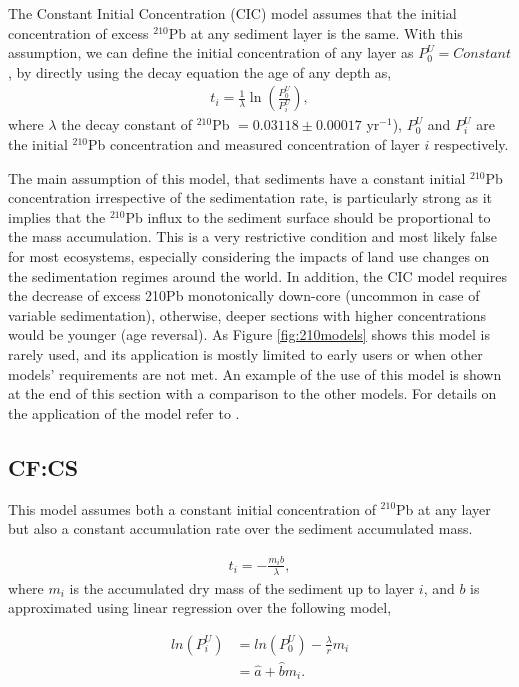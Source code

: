 \documentclass [10pt] {article}
\begin{document}
The Constant Initial Concentration (CIC) model \citep{Goldberg1963,Crozaz1964,Robbins1978} assumes that the initial concentration of excess $^{210}$Pb at any sediment layer is the same. 
With this assumption, we can define the initial concentration of any layer as $P_0^U = Constant$, by directly using the decay equation the age of any depth as,
\begin{eqnarray}
	t_i = \frac{1}{\lambda}\ln \left( \frac{P_0^U}{P_i^U}\right),
\end{eqnarray}
where $\lambda$ the decay constant of $^{210}$Pb $= 0.03118\pm 0.00017$ yr$^{-1}$), $P_0^U$ and $P_i^U$ are the initial $^{210}$Pb concentration and measured concentration of layer $i$ respectively. 

The main assumption of this model, that sediments have a constant initial $^{210}$Pb concentration irrespective of the sedimentation rate, is particularly strong as it implies that the $^{210}$Pb influx to the sediment surface should be proportional to the mass accumulation. 
This is a very restrictive condition and most likely false for most ecosystems, especially considering the impacts of land use changes on the sedimentation regimes around the world. 
In addition, the CIC model requires the decrease of excess 210Pb monotonically down-core (uncommon in case of variable sedimentation), otherwise, deeper sections with higher concentrations would be younger (age reversal).
As Figure \ref{fig:210models} shows this model is rarely used, and its application is mostly limited to early users or when other models’ requirements are not met.
An example of the use of this model is shown at the end of this section with a comparison to the other models. For details on the application of the model refer to \citet{Sanchez-Cabeza2012}.


\subsection{CF:CS}

This model assumes both a constant initial concentration of $^{210}$Pb at any layer but also a constant accumulation rate over the sediment accumulated mass.  

\begin{eqnarray}
	t_i = -\frac{m_i b}{\lambda},
\end{eqnarray}
where $m_i$ is the accumulated dry mass of the sediment up to layer $i$, and $b$ is approximated using linear regression over the following model,

\begin{eqnarray}
	ln(P_i^U) &= ln(P_0^U) - \frac{\lambda}{r}m_i \\
		   &= \hat{a} + \hat{b}m_i.
\end{eqnarray}
\end{document}
